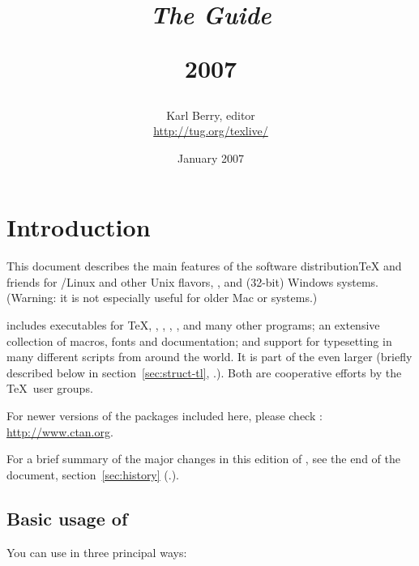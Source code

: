 \documentclass{article}
\begin{document}
\title{%
  {\huge \textit{The \protect\TL{} Guide}\\\strut}
  {\LARGE \textsf{\TL{} 2007}}
}

\author{Karl Berry, editor \\[3mm]
        \url{http://tug.org/texlive/}
       }

\date{January 2007}

\maketitle

\begin{multicols}{2}
\tableofcontents
\listoftables
\end{multicols}

\section{Introduction}
\label{sec:intro}

This document describes the main features of the \TL{} software
distribution\Dash \TeX{} and friends for /Linux and other Unix
flavors, \MacOSX, and (32-bit) Windows systems.  (Warning: it is not
especially useful for older Mac or  systems.)

\TL{} includes executables for \TeX{}, \LaTeXe{}, \ConTeXt, \MF, \MP,
\BibTeX{} and many other programs; an extensive collection of macros,
fonts and documentation; and support for typesetting in many different
scripts from around the world.  It is part of the even larger \TK{}
(briefly described below in section~\ref{sec:struct-tl},
\p.\pageref{sec:struct-tl}).  Both are cooperative efforts by the \TeX\
user groups.

For newer versions of the packages included here, please check
: \url{http://www.ctan.org}.

For a brief summary of the major changes in this edition of \TL{},
see the end of the document, section~\ref{sec:history}
(\p.\pageref{sec:history}).


\subsection{Basic usage of \protect\TL{}}
\label{sec:basic}

You can use \TL{} in three principal ways:
\end{document}
